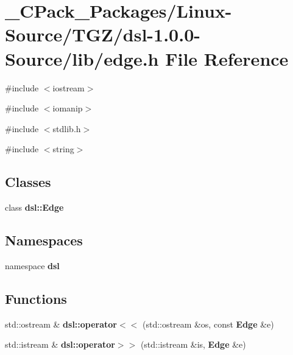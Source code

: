 \section{\_\-CPack\_\-Packages/Linux-\/Source/TGZ/dsl-\/1.0.0-\/Source/lib/edge.h File Reference}
\label{__CPack__Packages_2Linux-Source_2TGZ_2dsl-1_80_80-Source_2lib_2edge_8h}
{\ttfamily \#include $<$iostream$>$}\par
{\ttfamily \#include $<$iomanip$>$}\par
{\ttfamily \#include $<$stdlib.h$>$}\par
{\ttfamily \#include $<$string$>$}\par
\subsection*{Classes}
\begin{DoxyCompactItemize}
\item 
class {\bf dsl::Edge}
\end{DoxyCompactItemize}
\subsection*{Namespaces}
\begin{DoxyCompactItemize}
\item 
namespace {\bf dsl}
\end{DoxyCompactItemize}
\subsection*{Functions}
\begin{DoxyCompactItemize}
\item 
std::ostream \& {\bf dsl::operator$<$$<$} (std::ostream \&os, const {\bf Edge} \&e)
\item 
std::istream \& {\bf dsl::operator$>$$>$} (std::istream \&is, {\bf Edge} \&e)
\end{DoxyCompactItemize}
